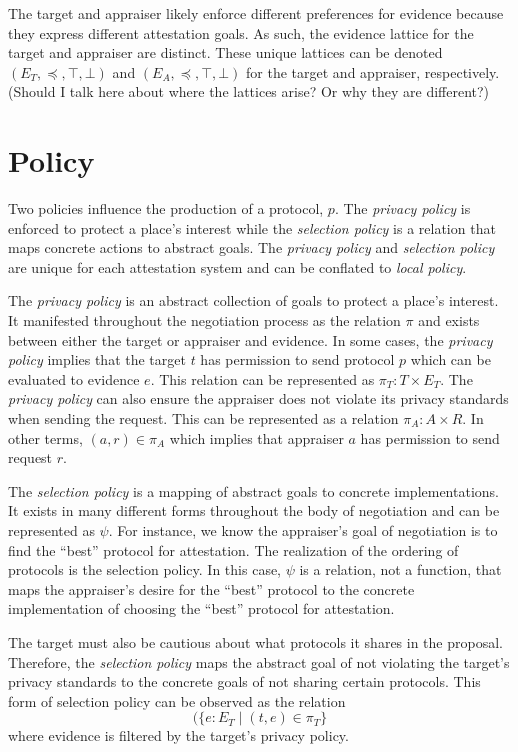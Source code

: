 \documentclass[sigconf,authordraft]{acmart}
\begin{document}
The target and appraiser likely enforce different preferences for evidence because they express different attestation goals. As such, the evidence lattice for the target and appraiser are distinct.  These unique lattices can be denoted $(E_T,\preceq,\top,\bot)$ and $(E_A,\preceq,\top,\bot)$ for the target and appraiser, respectively. (Should I talk here about where the lattices arise? Or why they are different?) 

\section{Policy}

Two policies influence the production of a protocol, $p$. The \emph{privacy policy} is enforced to protect a place's interest while the \emph{selection policy} is a relation that maps concrete actions to abstract goals. The \emph{privacy policy} and \emph{selection policy} are unique for each attestation system and can be conflated to \emph{local policy}.

The \emph{privacy policy} is an abstract collection of goals to protect a place's interest. It manifested throughout the negotiation process as the relation $\pi$ and exists between either the target or appraiser and evidence. In some cases, the \emph{privacy policy} implies that the target $t$ has permission to send protocol $p$ which can be evaluated to evidence $e$. This relation can be represented as $\pi_T : T\times E_T$. The \emph{privacy policy} can also ensure the appraiser does not violate its privacy standards when sending the request. This can be represented as a relation  $\pi_A : A\times R$. In other terms, $(a,r)\in\pi_A$ which implies that appraiser $a$ has permission to send request $r$.

The \emph{selection policy} is a mapping of abstract goals to concrete implementations. It exists in many different forms throughout the body of negotiation and can be represented as $\psi$. For instance, we know the appraiser's goal of negotiation is to find the ``best'' protocol for attestation. The realization of the ordering of protocols is the selection policy. In this case, $\psi$ is a relation, not a function, that maps the appraiser's desire for the ``best'' protocol to the concrete implementation of choosing the ``best'' protocol for attestation.

The target must also be cautious about what protocols it shares in the proposal. Therefore, the \emph{selection policy} maps the abstract goal of not violating the target's privacy standards to the concrete goals of not sharing certain protocols. This form of selection policy can be observed as the relation \[(\{e:E_T\mid (t,e)\in\pi_T\}\] where evidence is filtered by the target's privacy policy.   
\end{document}

